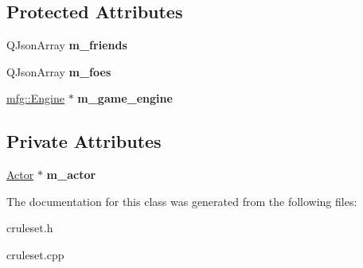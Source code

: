 \subsection*{Protected Attributes}
\begin{DoxyCompactItemize}
\item 
\mbox{\label{class_c_rule_set_ab3fa5bb02d758a87a79c3ad6ef676a70}} 
Q\+Json\+Array {\bfseries m\+\_\+friends}
\item 
\mbox{\label{class_c_rule_set_a04987c18a4548e3627392f605fedcece}} 
Q\+Json\+Array {\bfseries m\+\_\+foes}
\item 
\mbox{\label{class_c_rule_set_a13aa097c39944fac1faae66e652197ec}} 
\hyperlink{classmfg_1_1_engine}{mfg\+::\+Engine} $\ast$ {\bfseries m\+\_\+game\+\_\+engine}
\end{DoxyCompactItemize}
\subsection*{Private Attributes}
\begin{DoxyCompactItemize}
\item 
\mbox{\label{class_c_rule_set_a65b3f7bfee611db1679ce99adc3eeaa2}} 
\hyperlink{class_actor}{Actor} $\ast$ {\bfseries m\+\_\+actor}
\end{DoxyCompactItemize}


The documentation for this class was generated from the following files\+:\begin{DoxyCompactItemize}
\item 
cruleset.\+h\item 
cruleset.\+cpp\end{DoxyCompactItemize}
